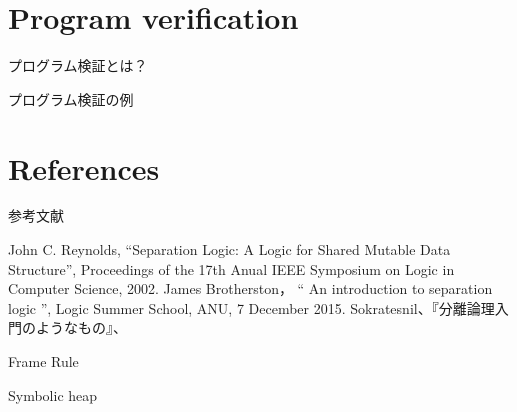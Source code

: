 \documentclass[notheorems, aspectratio=169, 12pt, unicode]{beamer}
\begin{document}
\section{Program verification}

\begin{frame}{プログラム検証とは？}
 
\end{frame}

\begin{frame}{プログラム検証の例}
 
\end{frame}

\section{References}

\begin{frame}{参考文献}
 \begin{thebibliography}{9}
   John C. Reynolds, ``Separation Logic: A Logic for Shared Mutable Data Structure'', Proceedings of the 17th Anual IEEE Symposium on Logic in Computer Science, 2002.
   James Brotherston，
	  `` An introduction to separation logic '', 
	  Logic Summer School, ANU, 7 December 2015.
 Sokratesnil、『分離論理入門のようなもの』、\url{}
 \end{thebibliography} 
\end{frame}

\appendix

\begin{frame}{Frame Rule}
 
\end{frame}

\begin{frame}{Symbolic heap}
 
\end{frame}
\end{document}
